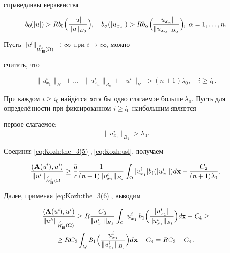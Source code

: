  справедливы неравенства

\begin{equation}\label{eq:Kozh:the_3(6)}

b_0(|u|)>Rb_0\Bigl(\frac{|u|}{\|u\|_{B_0}}\Bigr),\quad

b_{\alpha}(|u_{x_{\alpha}}|)>Rb_{\alpha}\Bigl(\frac{|u_{x_{\alpha}}|}{\|u_{x_{\alpha}}\|_{B_{\alpha}}}\Bigr),\;\alpha={1,\ldots,n}.

\end{equation}



Пусть $\|u^i\|_{

\stackrel {\circ}

{W}\!_{\bf B}^{1}(\Omega)} \to \infty$ при $i \to \infty$, можно

считать, что

$$\|u^{i}_{x_1}\|_{B_1}+\ldots+\|u^{i}_{x_n}\|_{B_n}+\|u^{i}\|_{B_0}>(n+1)\lambda_0,\quad

i\geq i_0.$$

При каждом $i\geq i_0$ найдётся хотя бы одно слагаемое больше $\lambda_0$. Пусть для определённости при фиксированном  $i\geq i_0$ наибольшим является

первое слагаемое: $$\|u^i_{x_1}\|_{B_1}>\lambda_0.$$





Соединяя \eqref{eq:Kozh:the_3(5)},  \eqref{eq:Kozh:usl}, получаем

$$

\frac{(\mathbf{A}(u^{i}),u^{i})}{\|u^{i}\|_{

\stackrel {\circ}

{W}\!_{\bf B}^{1}(\Omega)}}\geq\frac{\overline{a}}{c}\frac{1}{(n+1)\|u^{i}_{x_1}\|_{B_1}}

\int_{\Omega}|u^{i}_{x_1}|b_1(|u^{i}_{x_1}|)d{\bf

x}-\frac{C_2}{(n+1)\lambda_0}.

$$

Далее, применяя \eqref{eq:Kozh:the_3(6)}, выводим

\begin{multline*}

\frac{(\mathbf{A}(u^{i}),u^{i})}{\|u^{k}\|_{

\stackrel {\circ}

{W}\!_{\bf B}^{1}(\Omega)}}\geq R\frac{C_3}{\|u^{i}_{x_1}\|_{B_1}}

\int_{\Omega}|u^{i}_{x_1}|b_1\Bigl(\frac{|u^{i}_{x_1}|}{\|u^{i}_{x_1}\|_{B_1}}\Bigr)d{\bf

x}-{C_4}\geq

\\

\geq R{C_3}

\int_Q

B_1\Bigl(\frac{u^{i}_{x_1}}{\|u^{i}_{x_1}\|_{B_1}}\Bigr)d{\bf

x}-C_4=

RC_3-C_4.

\end{multline*}





